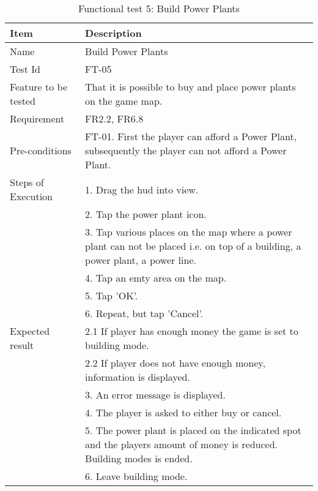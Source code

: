 \begin{table}[H]
\centering
	\begin{tabular}{ l | p{8cm} }
		\hline
		\rowcolor{lightgray}
		{\bf Item} & {\bf Description} \\ \hline
		Name & Build Power Plants \\ 
		Test Id & FT-05 \\ 
		Feature to be tested & That it is possible to buy and place power plants on the game map. \\ 
		Requirement & FR2.2, FR6.8 \\ 
		Pre-conditions & FT-01. First the player can afford a Power Plant, subsequently the player can not afford a Power Plant. \\
		Steps of Execution & 1. Drag the hud into view. \\ 
		& 2. Tap the power plant icon. \\
		& 3. Tap various places on the map where a power plant can not be placed i.e. on top of a building, a power plant, a power line. \\
		& 4. Tap an emty area on the map. \\
		& 5. Tap 'OK'. \\
		& 6. Repeat, but tap 'Cancel'. \\
		Expected result & 2.1 If player has enough money the game is set to building mode. \\
		& 2.2 If player does not have enough money, information is displayed. \\
		& 3. An error message is displayed. \\ 
		& 4. The player is asked to either buy or cancel. \\
		& 5. The power plant is placed on the indicated spot and the players amount of money is reduced. Building modes is ended. \\
		& 6. Leave building mode. \\
		\hline
	\end{tabular}
	\caption{Functional test 5: Build Power Plants}
\end{table}

